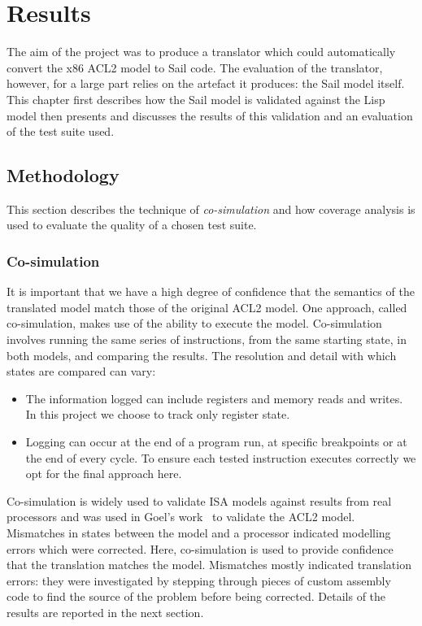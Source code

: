 \documentclass[a4paper,12pt,twoside,openright]{report}
\begin{document}
\hypertarget{chapter-results}{
\chapter{Results}\label{chapter-results}}

The aim of the project was to produce a translator which could automatically convert the x86 ACL2 model to Sail code.  The evaluation of the translator, however, for a large part relies on the artefact it produces: the Sail model itself.  This chapter first describes how the Sail model is validated against the Lisp model then presents and discusses the results of this validation and an evaluation of the test suite used.

\section{Methodology}

This section describes the technique of \emph{co-simulation} and how coverage analysis is used to evaluate the quality of a chosen test suite.

\subsection{Co-simulation}

It is important that we have a high degree of confidence that the semantics of the translated model match those of the original ACL2 model.  One approach, called co-simulation, makes use of the ability to execute the model.  Co-simulation involves running the same series of instructions, from the same starting state, in both models, and comparing the results.  The resolution and detail with which states are compared can vary:

\begin{itemize}
  \item The information logged can include registers and memory reads and writes.  In this project we choose to track only register state.
  \item Logging can occur at the end of a program run, at specific breakpoints or at the end of every cycle.  To  ensure each tested instruction executes correctly we opt for the final approach here.
\end{itemize}

Co-simulation is widely used to validate ISA models against results from real processors and was used in Goel's work~\cite{goel-thesis} to validate the ACL2 model.  Mismatches in states between the model and a processor indicated modelling errors which were corrected.  Here, co-simulation is used to provide confidence that the translation matches the model.  Mismatches mostly indicated translation errors: they were investigated by stepping through pieces of custom assembly code to find the source of the problem before being corrected.  Details of the results are reported in the next section.
\end{document}
